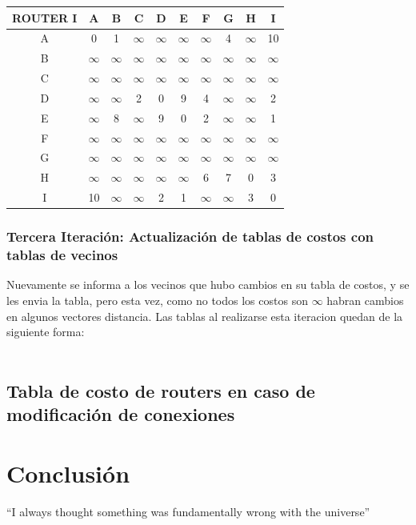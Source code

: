 \documentclass{article}
\begin{document}
\begin{tabular}{ | c | c | c | c | c | c | c | c | c | c |}
\hline                 
ROUTER I    & A      & B      & C      & D      & E      & F      & G      & H      & I      \\
\hline
        A   & 0      & 1      &$\infty$&$\infty$&$\infty$&$\infty$& 4      &$\infty$& 10     \\
\hline
        B   &$\infty$&$\infty$&$\infty$&$\infty$&$\infty$&$\infty$&$\infty$&$\infty$&$\infty$\\
\hline
        C   &$\infty$&$\infty$&$\infty$&$\infty$&$\infty$&$\infty$&$\infty$&$\infty$&$\infty$\\
\hline
        D   &$\infty$&$\infty$& 2      & 0      & 9      & 4      &$\infty$&$\infty$& 2      \\
\hline
        E   &$\infty$& 8      &$\infty$& 9      & 0      & 2      &$\infty$&$\infty$& 1      \\
\hline
        F   &$\infty$&$\infty$&$\infty$&$\infty$&$\infty$&$\infty$&$\infty$&$\infty$&$\infty$\\
\hline
        G   &$\infty$&$\infty$&$\infty$&$\infty$&$\infty$&$\infty$&$\infty$&$\infty$&$\infty$\\
\hline
        H   &$\infty$&$\infty$&$\infty$&$\infty$&$\infty$& 6      & 7      & 0      & 3      \\
\hline 
        I   & 10     &$\infty$&$\infty$& 2      & 1      &$\infty$&$\infty$& 3      & 0      \\
\hline
\end{tabular}

\subsubsection*{Tercera Iteración: Actualización de tablas de costos con tablas de vecinos}
Nuevamente se informa a los vecinos que hubo cambios en su tabla de costos, y se les envia la tabla, pero esta vez, como no todos los costos son $\infty$ habran cambios en algunos vectores distancia. Las tablas al realizarse esta iteracion quedan de la siguiente forma:\\
\\


\subsection{Tabla de costo de routers en caso de modificación de conexiones}

\section{Conclusión}
``I always thought something was fundamentally wrong with the universe'' \citep{adams1995hitchhiker}



\end{document}
